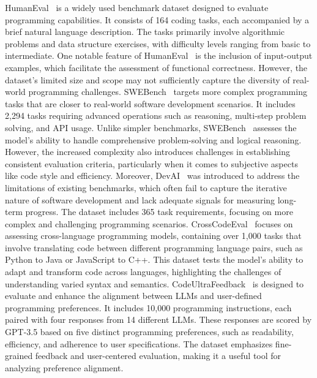 HumanEval~\cite{chen2021evaluating} is a widely used benchmark dataset designed to evaluate programming capabilities. It consists of 164 coding tasks, each accompanied by a brief natural language description. The tasks primarily involve algorithmic problems and data structure exercises, with difficulty levels ranging from basic to intermediate. 
One notable feature of HumanEval~\cite{chen2021evaluating} is the inclusion of input-output examples, which facilitate the assessment of functional correctness. However, the dataset's limited size and scope may not sufficiently capture the diversity of real-world programming challenges.
SWEBench~\cite{jimenez2023swe} targets more complex programming tasks that are closer to real-world software development scenarios. It includes 2,294 tasks requiring advanced operations such as reasoning, multi-step problem solving, and API usage. Unlike simpler benchmarks, SWEBench~\cite{jimenez2023swe} assesses the model's ability to handle comprehensive problem-solving and logical reasoning. However, the increased complexity also introduces challenges in establishing consistent evaluation criteria, particularly when it comes to subjective aspects like code style and efficiency. Moreover, DevAI~\cite{zhuge2024agent} was introduced to address the limitations of existing benchmarks, which often fail to capture the iterative nature of software development and lack adequate signals for measuring long-term progress. The dataset includes 365 task requirements, focusing on more complex and challenging programming scenarios.
CrossCodeEval~\cite{ding2024crosscodeeval} focuses on assessing cross-language programming models, containing over 1,000 tasks that involve translating code between different programming language pairs, such as Python to Java or JavaScript to C++. This dataset tests the model’s ability to adapt and transform code across languages, highlighting the challenges of understanding varied syntax and semantics. CodeUltraFeedback~\cite{weyssow2024codeultrafeedback} is designed to evaluate and enhance the alignment between LLMs and user-defined programming preferences. It includes 10,000 programming instructions, each paired with four responses from 14 different LLMs. These responses are scored by GPT-3.5 based on five distinct programming preferences, such as readability, efficiency, and adherence to user specifications. The dataset emphasizes fine-grained feedback and user-centered evaluation, making it a useful tool for analyzing preference alignment. 






